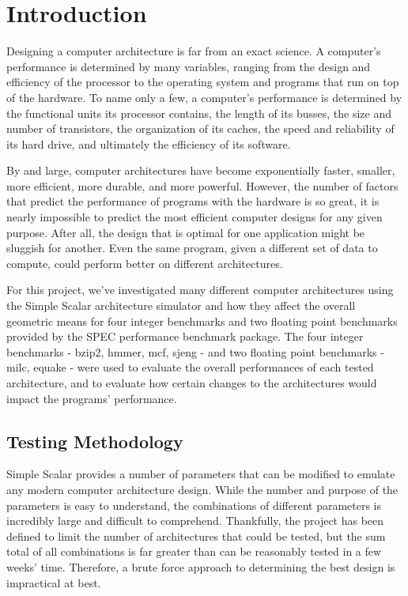 \documentclass[paper=a4, fontsize=12pt]{scrartcl} %
\numberwithin{equation}{section} %
\numberwithin{figure}{section} %
\numberwithin{table}{section} %
\begin{document}
\section{Introduction}

Designing a computer architecture is far from an exact science. A computer's performance is determined by many variables, ranging from the design and efficiency of the processor to the operating system and programs that run on top of the hardware. To name only a few, a computer's performance is determined by the functional units its processor contains, the length of its busses, the size and number of transistors, the organization of its caches, the speed and reliability of its hard drive, and ultimately the efficiency of its software.

By and large, computer architectures have become exponentially faster, smaller, more efficient, more durable, and more powerful. However, the number of factors that predict the performance of programs with the hardware is so great, it is nearly impossible to predict the most efficient computer designs for any given purpose. After all, the design that is optimal for one application might be sluggish for another. Even the same program, given a different set of data to compute, could perform better on different architectures.

For this project, we've investigated many different computer architectures using the Simple Scalar architecture simulator and how they affect the overall geometric means for four integer benchmarks and two floating point benchmarks provided by the SPEC performance benchmark package. The four integer benchmarks - bzip2, hmmer, mcf, sjeng - and two floating point benchmarks - milc, equake - were used to evaluate the overall performances of each tested architecture, and to evaluate how certain changes to the architectures would impact the programs' performance.


\subsection{Testing Methodology}

Simple Scalar provides a number of parameters that can be modified to emulate any modern computer architecture design. While the number and purpose of the parameters is easy to understand, the combinations of different parameters is incredibly large and difficult to comprehend. Thankfully, the project has been defined to limit the number of architectures that could be tested, but the sum total of all combinations is far greater than can be reasonably tested in a few weeks' time. Therefore, a brute force approach to determining the best design is impractical at best.
\end{document}
